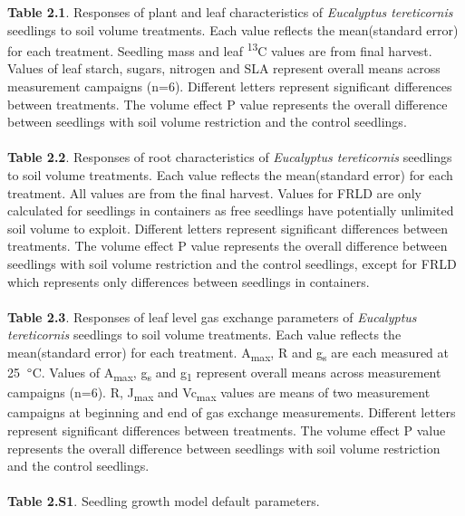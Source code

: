 \documentclass[a4paper]{article}
\begin{document}
\textbf{Table 2.1}. Responses of plant and leaf characteristics of \textit{Eucalyptus tereticornis} seedlings to soil volume treatments. Each value reflects the mean(standard error) for each treatment. Seedling mass and leaf {\textdelta}\textsuperscript{13}C values are from final harvest. Values of leaf starch, sugars, nitrogen and SLA represent overall means across measurement campaigns (n=6). Different letters represent significant differences between treatments. The volume effect P value represents the overall difference between seedlings with soil volume restriction and the control seedlings.
\\
\\
\textbf{Table 2.2}. Responses of root characteristics of \textit{Eucalyptus tereticornis} seedlings to soil volume treatments. Each value reflects the mean(standard error) for each treatment. All values are from the final harvest. Values for FRLD are only calculated for seedlings in containers as free seedlings have potentially unlimited soil volume to exploit. Different letters represent significant differences between treatments. The volume effect P value represents the overall difference between seedlings with soil volume restriction and the control seedlings, except for FRLD which represents only differences between seedlings in containers.
\\
\\
\textbf{Table 2.3}. Responses of leaf level gas exchange parameters of \textit{Eucalyptus tereticornis} seedlings to soil volume treatments. Each value reflects the mean(standard error) for each treatment. A\textsubscript{max}, R and g\textsubscript{s} are each measured at 25~$\degree$C. Values of A\textsubscript{max}, g\textsubscript{s} and g\textsubscript{1} represent overall means across measurement campaigns (n=6). R, J\textsubscript{max} and Vc\textsubscript{max} values are means of two measurement campaigns at beginning and end of gas exchange measurements. Different letters represent significant differences between treatments. The volume effect P value represents the overall difference between seedlings with soil volume restriction and the control seedlings.
\\
\\
\textbf{Table 2.S1}. Seedling growth model default parameters.
\\
\\
\end{document}
